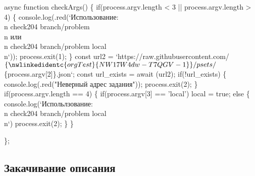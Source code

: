 async function checkArgs() 
\{
        if(process.argv.length < 3 || process.argv.length > 4)
        \{
                console.log(.red(`Использование: \\n 
                        check204 branch/problem \\n
                        или\\n
                        check204 branch/problem local\\n`));
                process.exit(1); 
        \}
        const url2 = `https://raw.githubusercontent.com/$\{\nwlinkedidentc{orgTest}{NW17W4dw-T7QGV-1}\}/psets/$\{process.argv[2]\}.json`;
        const url_exists = await (url2);
        if(!url_exists)
        \{
                console.log(.red("Неверный адрес задания"));
                process.exit(2);
        \}
        if(process.argv.length == 4)
        \{
                if(process.argv[3] == 'local')
                        local = true;
                else
                \{
                        console.log(`Испольлзование: \\n
                                check204 branch/problem local\\n`)
                        process.exit(2);
                \}
        \}
                
\};

\nwendcode{}\nwdocspar

\subsection{Закачивание описания}
\nwenddocs{}\endmoddef\nwstartdeflinemarkup{}\nwenddeflinemarkup

